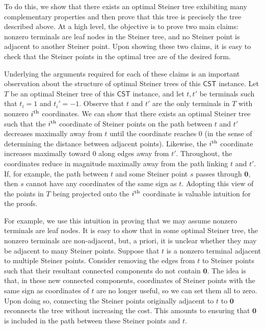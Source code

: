 \documentclass{theoretics}
\newcommand{\1}{\textbf{1}}
\newcommand{\cst}{$\mathsf{CST}$\xspace}
\begin{document}
To do this, we show that there exists an optimal Steiner tree exhibiting many complementary properties and then prove that this tree is precisely the tree described above. At a high level, the objective is to prove two main claims: nonzero terminals are leaf nodes in the Steiner tree, and no Steiner point is adjacent to another Steiner point. Upon showing these two claims, it is easy to check that the Steiner points in the optimal tree are of the desired form.

Underlying the arguments required for each of these claims is an important observation about the structure of optimal Steiner trees of this \cst instance. Let $T$ be an optimal Steiner tree of this \cst instance, and let $t, t'$ be terminals such that $t_i = 1$ and $t_i' = -1$.  Observe that $t$ and $t'$ are the only terminals in $T$ with nonzero $i\textsuperscript{th} $ coordinates. We can show that there exists an optimal Steiner tree such that the $i\textsuperscript{th} $ coordinate of Steiner points  on the path between $t$ and $t'$  decreases maximally away from $t$ until the coordinate reaches $0$ (in the sense of determining the distance between adjacent points). Likewise, the $i\textsuperscript{th} $ coordinate increases maximally toward $0$ along edges away from $t'$. Throughout, the coordinates reduce in magnitude maximally away from the path linking $t$ and $t'$. If, for example, the path between $t$ and some Steiner point $s$ passes through $\mathbf{0}$, then $s$ cannot have any coordinates of the same sign as $t$. Adopting this view of the points in $T$ being projected onto the $i\textsuperscript{th} $ coordinate is valuable intuition for the proofs.

For example, we use this intuition in proving that we may assume nonzero terminals are leaf nodes. It is easy to show that in some optimal Steiner tree, the nonzero terminals are non-adjacent, but, a priori, it is unclear whether they may be adjacent to many Steiner points. Suppose that $t$ is a nonzero terminal adjacent to multiple Steiner points. Consider removing the edges from $t$ to Steiner points such that their resultant connected components do not contain $\mathbf{0}$. The idea is that, in these new connected components, coordinates of Steiner points with the same sign as coordinates of $t$ are no longer useful, so we can set them all to zero. Upon doing so, connecting the Steiner points originally adjacent to $t$ to $\mathbf{0}$ reconnects the tree without increasing the cost. This amounts to ensuring that $\mathbf{0}$ is included in the path between these Steiner points and $t$.
\end{document}
